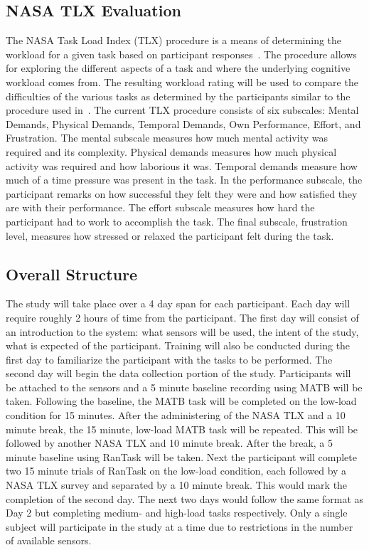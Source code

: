 \documentclass[11pt]{article}
\begin{document}
\subsection{NASA TLX Evaluation}
The NASA Task Load Index (TLX) procedure is a means of determining the workload for a given task based on participant responses~\cite{NASA}. The procedure allows for exploring the different aspects of a task and where the underlying cognitive workload comes from. The resulting workload rating will be used to compare the difficulties of the various tasks as determined by the participants similar to the procedure used in~\cite{Ke}. The current TLX procedure consists of six subscales: Mental Demands, Physical Demands, Temporal Demands, Own Performance, Effort, and Frustration. The mental subscale measures how much mental activity was required and its complexity. Physical demands measures how much physical activity was required and how laborious it was. Temporal demands measure how much of a time pressure was present in the task. In the performance subscale, the participant remarks on how successful they felt they were and how satisfied they are with their performance. The effort subscale measures how hard the participant had to work to accomplish the task. The final subscale, frustration level, measures how stressed or relaxed the participant felt during the task.

\subsection{Overall Structure}
The study will take place over a 4 day span for each participant. Each day will require roughly 2 hours of time from the participant. The first day will consist of an introduction to the system: what sensors will be used, the intent of the study, what is expected of the participant. Training will also be conducted during the first day to familiarize the participant with the tasks to be performed. The second day will begin the data collection portion of the study. Participants will be attached to the sensors and a 5 minute baseline recording using MATB will be taken. Following the baseline, the MATB task will be completed on the low-load condition for 15 minutes. After the administering of the NASA TLX and a 10 minute break, the 15 minute, low-load MATB task will be repeated. This will be followed by another NASA TLX and 10 minute break. After the break, a 5 minute baseline using RanTask will be taken. Next the participant will complete two 15 minute trials of RanTask on the low-load condition, each followed by a NASA TLX survey and separated by a 10 minute break. This would mark the completion of the second day. The next two days would follow the same format as Day 2 but completing medium- and high-load tasks respectively. Only a single subject will participate in the study at a time due to restrictions in the number of available sensors.
\end{document}

